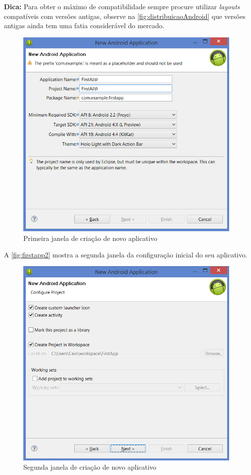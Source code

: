 \documentclass[a4paper,12pt,brazil,oneside]{book}
\begin{document}
\begin{framed}
\textbf{Dica:} Para obter o máximo de compatibilidade sempre procure utilizar \emph{layouts} compatíveis com versões antigas, observe na \autoref{fig:distribuicaoAndroid} que versões antigas ainda tem uma fatia considerável do mercado.
\end{framed}

\begin{figure}[H]
  \centering
  \includegraphics[width=.75\textwidth]{figuras/firstapp/firstapp1.png}
  \caption{Primeira janela de criação de novo aplicativo}
  \label{fig:firstapp1}
\end{figure}


A \autoref{fig:firstapp2} mostra a segunda janela da configuração inicial do seu aplicativo. 

\begin{figure}[H]
  \centering
  \includegraphics[width=.75\textwidth]{figuras/firstapp/firstapp2.png}
  \caption{Segunda janela de criação de novo aplicativo}
  \label{fig:firstapp2}
\end{figure}
\end{document}
